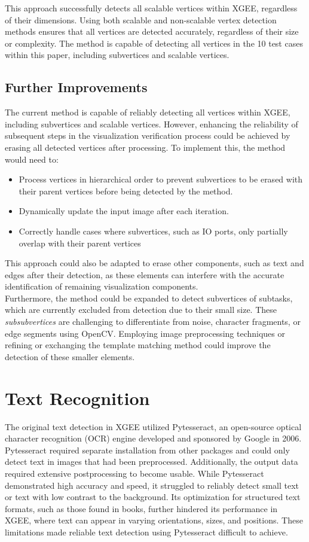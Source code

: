 This approach successfully detects all scalable vertices within XGEE, regardless of their dimensions. Using both scalable and non-scalable vertex detection methods ensures that all vertices are detected accurately, regardless of their size or complexity. The method is capable of detecting all vertices in the 10 test cases within this paper, including subvertices and scalable vertices.

\subsection{Further Improvements}
The current method is capable of reliably detecting all vertices within XGEE, including subvertices and scalable vertices. However, enhancing the reliability of subsequent steps in the visualization verification process could be achieved by erasing all detected vertices after processing. To implement this, the method would need to:
\begin{itemize}
    \item Process vertices in hierarchical order to prevent subvertices to be erased with their parent vertices before being detected by the method.
    \item Dynamically update the input image after each iteration.
    \item Correctly handle cases where subvertices, such as IO ports, only partially overlap with their parent vertices
\end{itemize}
This approach could also be adapted to erase other components, such as text and edges after their detection, as these elements can interfere with the accurate identification of remaining visualization components.\\
Furthermore, the method could be expanded to detect subvertices of subtasks, which are currently excluded from detection due to their small size. These \textit{subsubvertices} are challenging to differentiate from noise, character fragments, or edge segments using OpenCV. Employing image preprocessing techniques or refining or exchanging the template matching method could improve the detection of these smaller elements.

\section{Text Recognition}
The original text detection in XGEE utilized Pytesseract, an open-source optical character recognition (OCR) engine developed and sponsored by Google in 2006. Pytesseract required separate installation from other packages and could only detect text in images that had been preprocessed. Additionally, the output data required extensive postprocessing to become usable. While Pytesseract demonstrated high accuracy and speed, it struggled to reliably detect small text or text with low contrast to the background. Its optimization for structured text formats, such as those found in books, further hindered its performance in XGEE, where text can appear in varying orientations, sizes, and positions. These limitations made reliable text detection using Pytesseract difficult to achieve.
